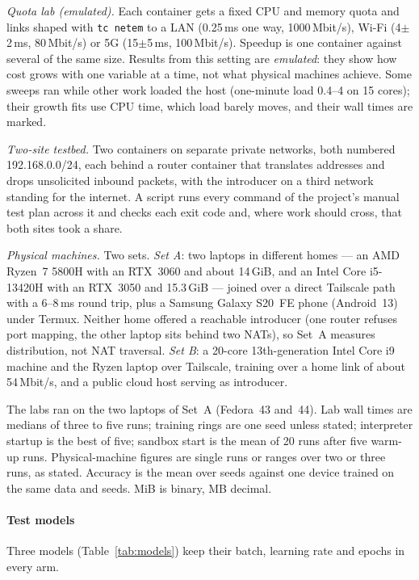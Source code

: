 \documentclass[5p,times,twocolumn]{elsarticle}
\begin{document}
\emph{Quota lab (emulated).} Each container gets a fixed CPU and memory quota
and links shaped with \texttt{tc netem} to a LAN (0.25\,ms one way,
1000\,Mbit/s), Wi-Fi (4$\pm$2\,ms, 80\,Mbit/s) or 5G (15$\pm$5\,ms,
100\,Mbit/s). Speedup is one container against several of the same size.
Results from this setting are \emph{emulated}: they show how cost grows with
one variable at a time, not what physical machines achieve. Some sweeps ran
while other work loaded the host (one-minute load 0.4--4 on 15 cores); their
growth fits use CPU time, which load barely moves, and their wall times are
marked.

\emph{Two-site testbed.} Two containers on separate private networks, both
numbered 192.168.0.0/24, each behind a router container that translates
addresses and drops unsolicited inbound packets, with the introducer on a third
network standing for the internet. A script runs every command of the
project's manual test plan across it and checks each exit code and, where work
should cross, that both sites took a share.

\emph{Physical machines.} Two sets. \emph{Set A}: two laptops in different
homes --- an AMD Ryzen~7 5800H with an RTX~3060 and about 14\,GiB, and an Intel
Core i5-13420H with an RTX~3050 and 15.3\,GiB --- joined over a direct Tailscale
path with a 6--8\,ms round trip, plus a Samsung Galaxy S20~FE phone (Android~13)
under Termux. Neither home offered a reachable introducer (one router refuses
port mapping, the other laptop sits behind two NATs), so Set~A measures
distribution, not NAT traversal. \emph{Set B}: a 20-core 13th-generation Intel
Core i9 machine and the Ryzen laptop over Tailscale, training over a home link
of about 54\,Mbit/s, and a public cloud host serving as introducer.

The labs ran on the two laptops of Set~A (Fedora~43 and~44). Lab wall times are
medians of three to five runs; training rings are one seed unless stated;
interpreter startup is the best of five; sandbox start is the mean of 20 runs
after five warm-up runs. Physical-machine figures are single runs or ranges
over two or three runs, as stated. Accuracy is the mean over seeds against one
device trained on the same data and seeds. MiB is binary, MB decimal.

\paragraph{Test models} Three models (Table~\ref{tab:models}) keep their batch,
learning rate and epochs in every arm.
\end{document}
